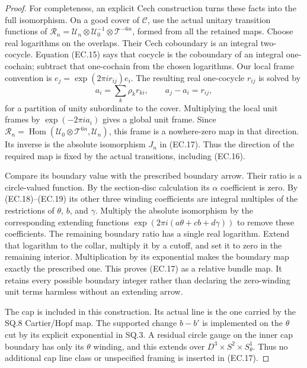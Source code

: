 \begin{proof}
For completeness, an explicit Cech construction turns these facts
into the full isomorphism. On a good cover of \(\mathcal C\), use
the actual unitary transition functions of
\(\mathcal R_n=\mathcal U_n\otimes\mathcal U_0^{-1}
\otimes\mathcal T^{-6n}\), formed from all the retained maps.
Choose real logarithms on the overlaps. Their Cech coboundary
is an integral two-cocycle. Equation (EC.15) says that cocycle
is the coboundary of an integral one-cochain; subtract that
one-cochain from the chosen logarithms. Our local frame convention
is \(e_j=\exp(2\pi i r_{ij})e_i\). The resulting real
one-cocycle \(r_{ij}\) is solved by
\[
                  a_i=\sum_k\rho_k r_{ki},\qquad
                  a_j-a_i=r_{ij},                    \tag{EC.21}
\]
for a partition of unity subordinate to the cover. Multiplying
the local unit frames by \(\exp(-2\pi i a_i)\) gives a global
unit frame. Since
\(\mathcal R_n=\operatorname{Hom}
(\mathcal U_0\otimes\mathcal T^{6n},\mathcal U_n)\),
this frame is a nowhere-zero map in that direction. Its inverse
is the absolute isomorphism \(J_n\) in (EC.17).
Thus the direction of the required map is fixed by the actual
transitions, including (EC.16).

Compare its boundary value with the prescribed boundary arrow.
Their ratio is a circle-valued function. By the section-disc
calculation its \(\alpha\) coefficient is zero. By (EC.18)--(EC.19)
its other three winding coefficients are integral multiples
of the restrictions of \(\theta\), \(b\), and \(\gamma\). Multiply the
absolute isomorphism by the corresponding extending functions
\(\exp(2\pi i(a\theta+cb+d\gamma))\) to remove these coefficients.
The remaining boundary ratio has a single real logarithm.
Extend that logarithm to the collar, multiply it by a cutoff,
and set it to zero in the remaining interior. Multiplication
by its exponential makes the boundary map exactly the
prescribed one. This proves (EC.17) as a relative bundle map.
It retains every possible boundary integer rather than declaring
the zero-winding unit terms harmless without an extending arrow.

The cap is included in this construction. Its actual line is
the one carried by the SQ.8 Cartier/Hopf map. The supported
change \(b-b'\) is implemented on the \(\theta\) cut by its explicit
exponential in SQ.3. A residual circle gauge on the inner cap
boundary has only its \(\theta\) winding, and this extends over
\(D^3\times S^2\times S^1_\theta\). Thus no additional cap
line class or unspecified framing is inserted in (EC.17).


\end{proof}
